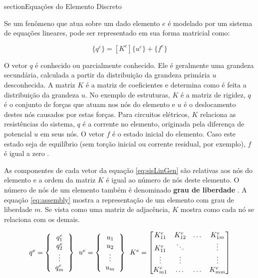 \documentclass[
    12pt,               %
    openright,          %
    oneside,
    a4paper,            %
    english,            %
    french,             %
    spanish,            %
    brazil              %
    ]{abntex2}
\begin{document}
\begin{apendicesenv}
section{Equações do Elemento Discreto}

Se um fenômeno que atua sobre um dado elemento $e$ é modelado por um sistema de equações lineares,  pode ser representado em sua forma matricial como:

\begin{equation}
\label{eq:sisLinGen}
\{q^e\} = [K^e] \{u^e\} + \{f^e\}
\end{equation}

O vetor $q$ é conhecido ou parcialmente conhecido. Ele é geralmente uma grandeza secundária, calculada a partir da distribuição da grandeza primária $u$ desconhecida. A matriz $K$ é a matriz de coeficientes e determina como é feita a distribuição da grandeza $u$. No exemplo de estruturas, $K$ é a matriz de rigidez, $q$ é o conjunto de forças que atuam nos nós do elemento e $u$ é o deslocamento destes nós causados por estas forças. Para circuitos elétricos, $K$ relaciona as resistências do sistema, $q$ é a corrente no elemento, originada pela diferença de potencial $u$ em seus nós. O vetor $f$ é o estado inicial do elemento. Caso este estado seja de equilíbrio (sem torção inicial ou corrente residual, por exemplo), $f$ é igual a zero \cite[p. 7]{zien}.

As componentes de cada vetor da equação \ref{eq:sisLinGen} são relativas aos nós do elemento e a ordem da matriz $K$ é igual ao número de nós deste elemento. O número de nós de um elemento também é denominado \textbf{grau de liberdade} \cite[p. 5]{zien}. A equação \ref{eq:assembly} mostra a representação de um elemento com grau de liberdade  $m$. Se vista como uma matriz de adjacência, $K$ mostra como cada nó se relaciona com os demais. 

\begin{equation}
\label{eq:assembly}
\begin{tabular}{c c c}
$q^e = 
\left \{
\begin{tabular}{c}
$q^e_1$ \\
$q^e_2$ \\
\vdots \\
$q^e_m$
\end{tabular}       
\right \}$
\
$u^e = 
\left \{
\begin{tabular}{c}
$u_1$ \\
$u_2$ \\
\vdots \\
$u_m$
\end{tabular}       
\right \}   $
\
$K^e =
\begin{bmatrix}
K^e_{11}    & K^e_{12}  & \dots     & K^e_{1m} \\
K^e_{11}    & \ddots  & \   & \vdots \\
\vdots  & \vdots     & \    & \vdots \\
K^e_{m1}    & \dots   & \dots   & K^e_{mm} 
\end{bmatrix}    $      
\end{tabular} 
\end{equation}



\end{apendicesenv}
\end{document}
